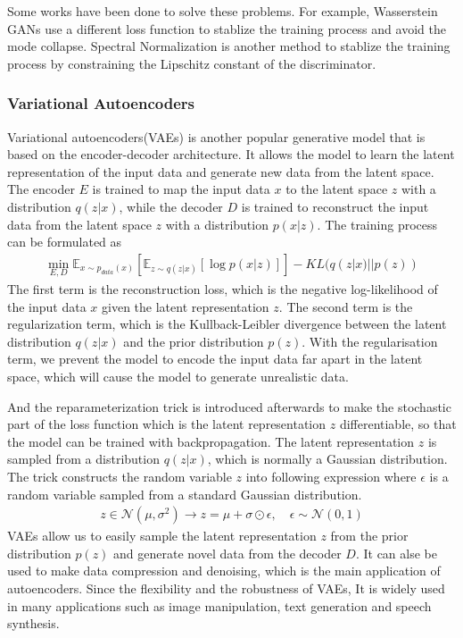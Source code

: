 \documentclass[12pt,DIV14,BCOR12mm,a4paper,footinclude=false,headinclude,parskip=half-,twoside,openright,cleardoublepage=empty,toc=index,bibliography=totoc,listof=totoc]{scrreprt}
\numberwithin{equation}{chapter}
\begin{document}
Some works have been done to solve these problems. For example, Wasserstein GANs\cite{arjovsky2017wasserstein} use a different loss function to stablize the training process and avoid the mode collapse. Spectral Normalization\cite{miyato2018spectral} is another method to stablize the training process by constraining the Lipschitz constant of the discriminator.
\subsubsection{Variational Autoencoders}
Variational autoencoders(VAEs)\cite{kingma2022autoencoding} is another popular generative model that is based on the encoder-decoder architecture. It allows the model to learn the latent representation of the input data and generate new data from the latent space. The encoder $E$ is trained to map the input data $x$ to the latent space $z$ with a distribution $q(z|x)$, while the decoder $D$ is trained to reconstruct the input data from the latent space $z$ with a distribution $p(x|z)$. The training process can be formulated as
\begin{align}
  \min_{E,D} \mathbb{E}_{x\sim p_{data}(x)}[\mathbb{E}_{z\sim q(z|x)}[\log p(x|z)]] - KL(q(z|x)||p(z))
\end{align}
The first term is the reconstruction loss, which is the negative log-likelihood of the input data $x$ given the latent representation $z$. The second term is the regularization term, which is the Kullback-Leibler divergence between the latent distribution $q(z|x)$ and the prior distribution $p(z)$. With the regularisation term, we prevent the model to encode the input data far apart in the latent space, which will cause the model to generate unrealistic data.

And the reparameterization trick\cite{kingma2015variational} is introduced afterwards to make the stochastic part of the loss function which is the latent representation $z$ differentiable, so that the model can be trained with backpropagation. The latent representation $z$ is sampled from a distribution $q(z|x)$, which is normally a Gaussian distribution. The trick constructs the random variable $z$ into following expression where $\epsilon$ is a random variable sampled from a standard Gaussian distribution.
\begin{align}
  z \in \mathcal{N} (\mu, \sigma^{2}) \longrightarrow z = \mu + \sigma \odot \epsilon, \quad \epsilon \sim \mathcal{N} (0, 1)
\end{align}
VAEs allow us to easily sample the latent representation $z$ from the prior distribution $p(z)$ and generate novel data from the decoder $D$. It can alse be used to make data compression and denoising, which is the main application of autoencoders. Since the flexibility and the robustness of VAEs, It is widely used in many applications such as image manipulation, text generation and speech synthesis.
\end{document}
